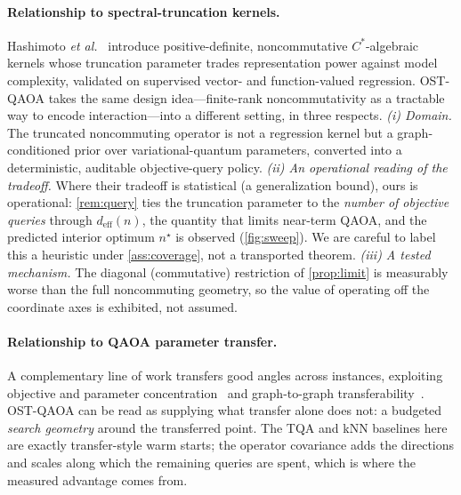 \documentclass[aps,prxquantum,reprint,amsmath,amssymb,floatfix,nofootinbib,superscriptaddress,longbibliography]{revtex4-2}
\theoremstyle{remark}
\newcommand{\OSTQAOA}{\textnormal{\textsc{OST-QAOA}}}
\newcommand{\TQA}{\textnormal{\textsc{TQA}}}
\begin{document}
\paragraph{Relationship to spectral-truncation kernels.}
Hashimoto \emph{et al.}~\cite{hashimoto2024spectral} introduce positive-definite,
noncommutative \(C^*\)-algebraic kernels whose truncation parameter trades
representation power against model complexity, validated on supervised vector-
and function-valued regression.  \OSTQAOA{} takes the same design idea---finite-rank
noncommutativity as a tractable way to encode interaction---into a different
setting, in three respects.  \emph{(i) Domain.}  The truncated noncommuting
operator is not a regression kernel but a graph-conditioned prior over
variational-quantum parameters, converted into a deterministic, auditable
objective-query policy.  \emph{(ii) An operational reading of the tradeoff.}
Where their tradeoff is statistical (a generalization bound), ours is operational:
\cref{rem:query} ties the truncation parameter to the \emph{number of objective
queries} through \(d_{\mathrm{eff}}(n)\), the quantity that limits near-term QAOA,
and the predicted interior optimum \(n^{\star}\) is observed (\cref{fig:sweep}).
We are careful to label this a heuristic under \cref{ass:coverage}, not a
transported theorem.  \emph{(iii) A tested mechanism.}  The diagonal (commutative)
restriction of \cref{prop:limit} is measurably worse than the full noncommuting
geometry, so the value of operating off the coordinate axes is exhibited, not
assumed.

\paragraph{Relationship to QAOA parameter transfer.}
A complementary line of work transfers good angles across instances, exploiting
objective and parameter concentration~\cite{brandao2018,akshay2021} and
graph-to-graph transferability~\cite{galda2021,shaydulin2023transfer}.
\OSTQAOA{} can be read as supplying what transfer alone does not: a budgeted
\emph{search geometry} around the transferred point.  The \TQA{} and kNN
baselines here are exactly transfer-style warm starts; the operator covariance
adds the directions and scales along which the remaining queries are spent, which
is where the measured advantage comes from.
\end{document}
